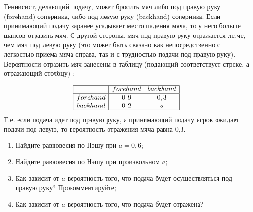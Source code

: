 \begin{problem}
\begin{source}
\cite[6.4]{gintis:gte}
\end{source}
Теннисист, делающий подачу, может бросить мяч либо под правую руку (forehand) соперника, либо под левую руку (backhand) соперника. Если принимающий подачу заранее угадывает место падения мяча, то у него больше шансов отразить мяч. С другой стороны, мяч под правую руку отражается легче, чем мяч под левую руку (это может быть связано как непосредственно с легкостью приема мяча справа, так и с трудностью подачи под правую руку). Вероятности отразить мяч занесены в таблицу (подающий соответствует строке, а отражающий столбцу) :\par
\[\begin{array}{|c|cc|}
\hline
{} & {forehand} & {backhand} \\
\hline {forehand} & {0,9} & {0,3} \\
{backhand} & {0,2} & {a} \\
\hline
\end{array}\]
Т.е. если подача идет под правую руку, а принимающий подачу игрок ожидает подачи под левую, то вероятность отражения мяча равна 0,3.
\begin{enumerate}
\item  Найдите равновесия по Нэшу при  $a=0,6$;\par
\item Найдите равновесия по Нэшу при произвольном  $a$;\par
\item  Как зависит от  $a$  вероятность того, что подача будет осуществляться под правую руку? Прокомментируйте;\par
\item Как зависит от  $a$  вероятность того, что подача будет отражена?\par
\end{enumerate}


\begin{sol}

\end{sol}
\end{problem}






